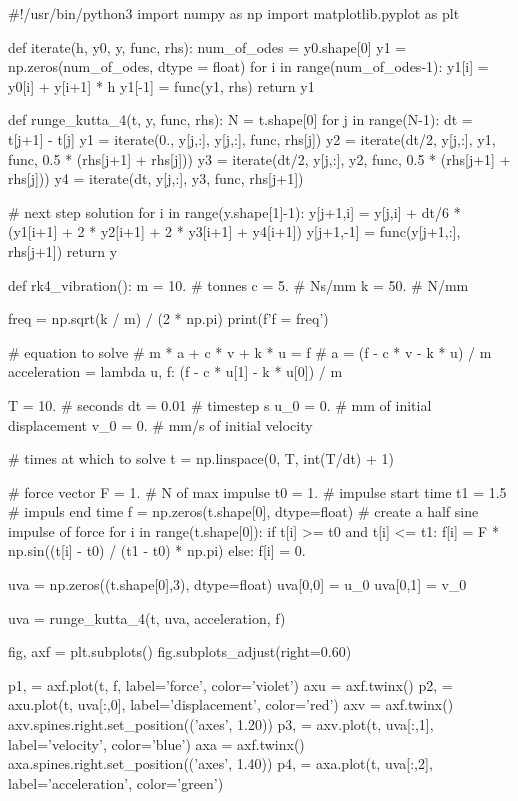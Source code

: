 \begin{python}
#!/usr/bin/python3
import numpy as np
import matplotlib.pyplot as plt


def iterate(h, y0, y, func, rhs):
    num_of_odes = y0.shape[0]
    y1 = np.zeros(num_of_odes, dtype = float)
    for i in range(num_of_odes-1):
        y1[i] = y0[i] + y[i+1] * h
    y1[-1] = func(y1, rhs)
    return y1


def runge_kutta_4(t, y, func, rhs):
    N = t.shape[0]
    for j in range(N-1):
        dt = t[j+1] - t[j]
        y1 = iterate(0., y[j,:], y[j,:], func, rhs[j])
        y2 = iterate(dt/2, y[j,:], y1, func, 0.5 * (rhs[j+1] + rhs[j]))
        y3 = iterate(dt/2, y[j,:], y2, func, 0.5 * (rhs[j+1] + rhs[j]))
        y4 = iterate(dt, y[j,:], y3, func, rhs[j+1])

        # next step solution
        for i in range(y.shape[1]-1):
            y[j+1,i] = y[j,i] + dt/6 * (y1[i+1] + 2 * y2[i+1] + 2 * y3[i+1] + y4[i+1])
        y[j+1,-1] = func(y[j+1,:], rhs[j+1])
    return y


def rk4_vibration():
    m = 10.   # tonnes
    c = 5.    # Ns/mm
    k = 50.   # N/mm

    freq = np.sqrt(k / m) / (2 * np.pi)
    print(f'f = {freq}')

    # equation to solve
    # m * a + c * v + k * u = f
    # a = (f - c * v - k * u) / m
    acceleration = lambda u, f: (f - c * u[1] - k * u[0]) / m

    T = 10.     # seconds
    dt = 0.01   # timestep s
    u_0 = 0.    # mm of initial displacement
    v_0 = 0.    # mm/s of initial velocity

    # times at which to solve
    t = np.linspace(0, T, int(T/dt) + 1)

    # force vector
    F = 1.    # N of max impulse
    t0 = 1.   # impulse start time
    t1 = 1.5  # impuls end time
    f = np.zeros(t.shape[0], dtype=float)
    # create a half sine impulse of force
    for i in range(t.shape[0]):
        if t[i] >= t0 and t[i] <= t1:
            f[i] = F * np.sin((t[i] - t0) / (t1 - t0) * np.pi)
        else:
            f[i] = 0.

    uva = np.zeros((t.shape[0],3), dtype=float)
    uva[0,0] = u_0
    uva[0,1] = v_0

    uva = runge_kutta_4(t, uva, acceleration, f)

    fig, axf = plt.subplots()
    fig.subplots_adjust(right=0.60)

    p1, = axf.plot(t, f, label='force', color='violet')
    axu = axf.twinx()
    p2, = axu.plot(t, uva[:,0], label='displacement', color='red')
    axv = axf.twinx()
    axv.spines.right.set_position(('axes', 1.20))
    p3, = axv.plot(t, uva[:,1], label='velocity', color='blue')
    axa = axf.twinx()
    axa.spines.right.set_position(('axes', 1.40))
    p4, = axa.plot(t, uva[:,2], label='acceleration', color='green')


\end{python}
